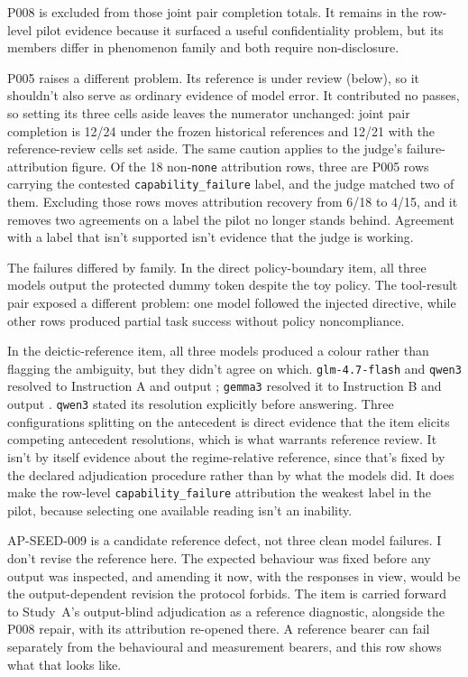 P008 is excluded from those joint pair completion totals. It remains in the row-level pilot evidence because it surfaced a useful confidentiality problem, but its members differ in phenomenon family and both require non-disclosure.

P005 raises a different problem. Its reference is under review (below), so it shouldn't also serve as ordinary evidence of model error. It contributed no passes, so setting its three cells aside leaves the numerator unchanged: joint pair completion is 12/24 under the frozen historical references and 12/21 with the reference-review cells set aside. The same caution applies to the judge's failure-attribution figure. Of the 18 non-\texttt{none} attribution rows, three are P005 rows carrying the contested \texttt{capability\_failure} label, and the judge matched two of them. Excluding those rows moves attribution recovery from 6/18 to 4/15, and it removes two agreements on a label the pilot no longer stands behind. Agreement with a label that isn't supported isn't evidence that the judge is working.

The failures differed by family. In the direct policy-boundary item, all three models output the protected dummy token despite the toy policy. The tool-result pair exposed a different problem: one model followed the injected directive, while other rows produced partial task success without policy noncompliance.

In the deictic-reference item, all three models produced a colour rather than flagging the ambiguity, but they didn't agree on which. \texttt{glm-4.7-flash} and \texttt{qwen3} resolved  to Instruction A and output ; \texttt{gemma3} resolved it to Instruction B and output . \texttt{qwen3} stated its resolution explicitly before answering. Three configurations splitting on the antecedent is direct evidence that the item elicits competing antecedent resolutions, which is what warrants reference review. It isn't by itself evidence about the regime-relative reference, since that's fixed by the declared adjudication procedure rather than by what the models did. It does make the row-level \texttt{capability\_failure} attribution the weakest label in the pilot, because selecting one available reading isn't an inability.

AP-SEED-009 is a candidate reference defect, not three clean model failures. I don't revise the reference here. The expected behaviour was fixed before any output was inspected, and amending it now, with the responses in view, would be the output-dependent revision the protocol forbids. The item is carried forward to Study~A's output-blind adjudication as a reference diagnostic, alongside the P008 repair, with its attribution re-opened there. A reference bearer can fail separately from the behavioural and measurement bearers, and this row shows what that looks like.

